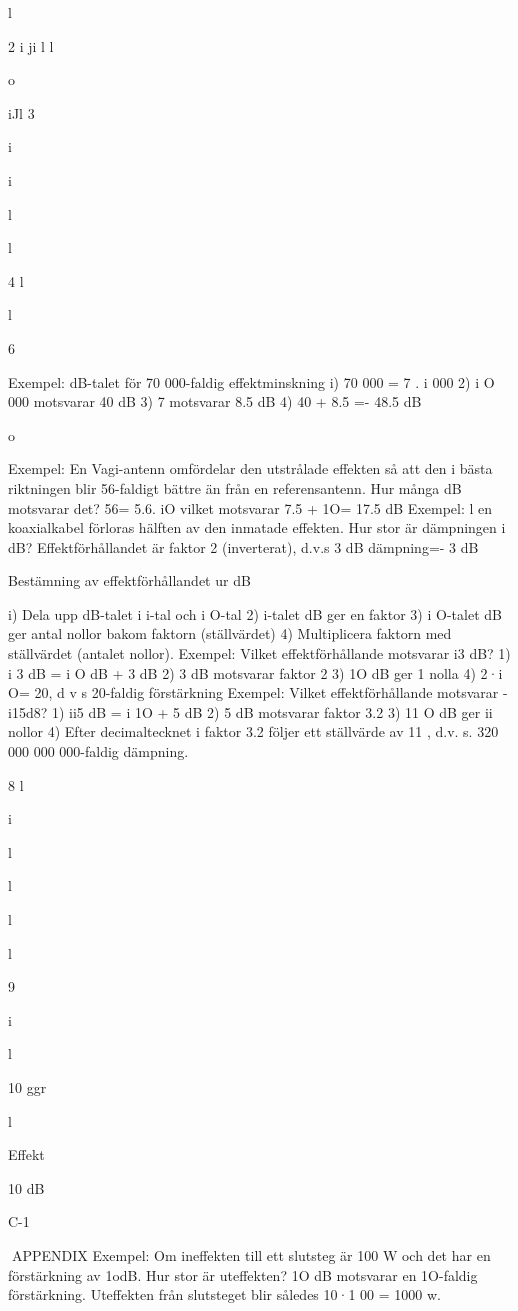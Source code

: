 \documentclass[a4paper,twoside,twocolumn,openright]{book}
\begin{document}
{{{{{{{{{{{{{l

2
i ji l l

o

iJl
3

i

i

l

l

4
l

l

6

Exempel: dB-talet för 70 000-faldig effektminskning
i) 70 000 = 7 . i 000
2) i O 000 motsvarar 40 dB
3) 7 motsvarar 8.5 dB
4) 40 + 8.5 =- 48.5 dB

o

Exempel: En Vagi-antenn omfördelar den
utstrålade effekten så att den i bästa riktningen blir 56-faldigt bättre än från en
referensantenn. Hur många dB motsvarar
det?
56= 5.6. iO
vilket motsvarar 7.5 + 1O= 17.5 dB
Exempel: l en koaxialkabel förloras hälften
av den inmatade effekten. Hur stor är
dämpningen i dB?
Effektförhållandet är faktor 2 (inverterat),
d.v.s 3 dB dämpning=- 3 dB

Bestämning av effektförhållandet ur dB

i) Dela upp dB-talet i i-tal och i O-tal
2) i-talet dB ger en faktor
3) i O-talet dB ger antal nollor bakom faktorn
(ställvärdet)
4) Multiplicera faktorn med ställvärdet
(antalet nollor).
Exempel: Vilket effektförhållande motsvarar
i3 dB?
1) i 3 dB = i O dB + 3 dB
2) 3 dB motsvarar faktor 2
3) 1O dB ger 1 nolla
4) 2·i O= 20, d v s 20-faldig förstärkning
Exempel: Vilket effektförhållande motsvarar
-i15d8?
1) ii5 dB = i 1O + 5 dB
2) 5 dB motsvarar faktor 3.2
3) 11 O dB ger ii nollor
4) Efter decimaltecknet i faktor 3.2 följer ett
ställvärde av 11 ,
d.v. s. 320 000 000 000-faldig dämpning.

8
l

i

l

l

l

l

9

i

l

10 ggr

l

Effekt

10 dB

C-1

APPENDIX
Exempel: Om ineffekten till ett slutsteg är
100 W och det har en förstärkning av 1odB.
Hur stor är uteffekten?
1O dB motsvarar en 1O-faldig förstärkning.
Uteffekten från slutsteget blir således 10·1 00
= 1000 w.

}}}}}}}}}}}}}
\end{document}
